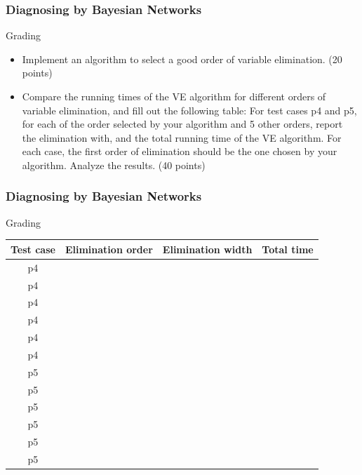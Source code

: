 \documentclass{beamer}
\begin{document}
\begin{frame}    

  \frametitle{Diagnosing by Bayesian Networks}

  \begin{block}{Grading}
\begin{itemize}


\item Implement an algorithm to select a good order of variable elimination. (20 points)
\item Compare the running times of the VE algorithm for different orders of variable elimination, and fill out the following table: For test cases p4 and p5, for each of the order selected by your algorithm and 5 other orders, report the elimination with, and the total running time of the VE algorithm. For each case, the first order of elimination should be the one chosen by your algorithm. Analyze the results. (40 points)
    

\end{itemize}
  \end{block}


\end{frame}





\begin{frame}    

  \frametitle{Diagnosing by Bayesian Networks}

  \begin{block}{Grading}

    \begin{tabular}{|c|c|c|c|}
\hline
Test case                                                                                             & Elimination order & Elimination width  & Total time \\ \hline
p4  & &  &            \\ \hline
p4  & &  &            \\ \hline
p4  & &  &            \\ \hline
p4  & &  &            \\ \hline
p4  & &  &            \\ \hline
p4  & &  &            \\ \hline
p5  & &  &            \\ \hline
p5  & &  &            \\ \hline
p5  & &  &            \\ \hline
p5  & &  &            \\ \hline
p5  & &  &            \\ \hline
p5  & &  &            \\ \hline
\end{tabular} 
  \end{block}


\end{frame}
\end{document}
